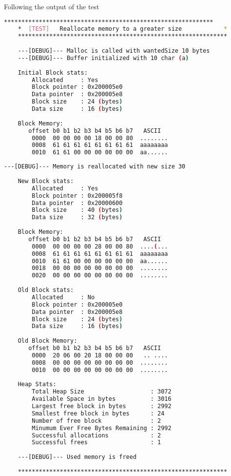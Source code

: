     Following the output of the test

    \begin{outputbox}
    \begin{lstlisting}[language=bash]
    ************************************************************
    *  [TEST]   Reallocate memory to a greater size            *
    ************************************************************
    
    ---[DEBUG]--- Malloc is called with wantedSize 10 bytes
    ---[DEBUG]--- Buffer initialized with 10 char (a)
    
    Initial Block stats:
        Allocated     : Yes
        Block pointer : 0x200005e0
        Data pointer  : 0x200005e8
        Block size    : 24 (bytes)
        Data size     : 16 (bytes)
    
    Block Memory:
       offset b0 b1 b2 b3 b4 b5 b6 b7   ASCII
        0000  00 00 00 00 18 00 00 80  ........
        0008  61 61 61 61 61 61 61 61  aaaaaaaa
        0010  61 61 00 00 00 00 00 00  aa......
    \end{lstlisting}
    \end{outputbox}
    
    \begin{outputbox}
    \begin{lstlisting}[language=bash]
    ---[DEBUG]--- Memory is reallocated with new size 30
    
    New Block stats:
        Allocated     : Yes
        Block pointer : 0x200005f8
        Data pointer  : 0x20000600
        Block size    : 40 (bytes)
        Data size     : 32 (bytes)
    
    Block Memory:
       offset b0 b1 b2 b3 b4 b5 b6 b7   ASCII
        0000  00 00 00 00 28 00 00 80  ....(...
        0008  61 61 61 61 61 61 61 61  aaaaaaaa
        0010  61 61 00 00 00 00 00 00  aa......
        0018  00 00 00 00 00 00 00 00  ........
        0020  00 00 00 00 00 00 00 00  ........
    
    Old Block stats:
        Allocated     : No
        Block pointer : 0x200005e0
        Data pointer  : 0x200005e8
        Block size    : 24 (bytes)
        Data size     : 16 (bytes)
    
    Old Block Memory:
       offset b0 b1 b2 b3 b4 b5 b6 b7   ASCII
        0000  20 06 00 20 18 00 00 00   .. ....
        0008  00 00 00 00 00 00 00 00  ........
        0010  00 00 00 00 00 00 00 00  ........
    
    Heap Stats:
        Total Heap Size                   : 3072
        Available Space in bytes          : 3016
        Largest free block in bytes       : 2992
        Smallest free block in bytes      : 24
        Number of free block              : 2
        Minumum Ever Free Bytes Remaining : 2992
        Successful allocations            : 2
        Successful frees                  : 1
    
    ---[DEBUG]--- Used memory is freed
    
    ************************************************************
    \end{lstlisting}
    \end{outputbox}

